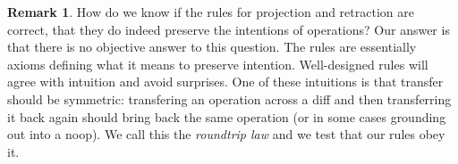 \documentclass[english,submission]{programming}
\theoremstyle{definition}
\newtheorem*{remark}{Remark}
\newcommand{\mathbox}[1]{\colorbox{black!10}{$#1$\phantom{i\hspace{-3.5pt}}}}
\begin{document}
\begin{remark}
How do we know if the rules for projection and retraction are correct, that they do indeed preserve the intentions of operations? Our answer is that there is no objective answer to this question. The rules are essentially axioms defining what it means to preserve intention. Well-designed rules will agree with intuition and avoid surprises. One of these intuitions is that transfer should be symmetric: transfering an operation across a diff and then transferring it back again should bring back the same operation (or in some cases grounding out into a \textsf{noop}). We call this the \textit{roundtrip law} and we test that our rules obey it.



\end{remark}
\end{document}
